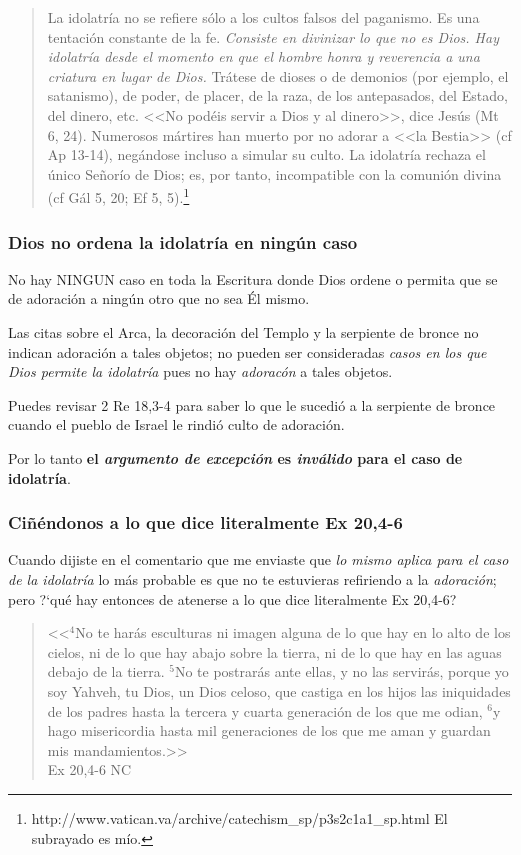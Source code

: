 \documentclass{article}
\begin{document}
\begin{quote}
La idolatría no se refiere sólo a los cultos falsos del paganismo. Es una tentación constante de la fe. \emph{Consiste en divinizar lo que no es Dios. Hay idolatría desde el momento en que el hombre honra y reverencia a una criatura en lugar de Dios.} Trátese de dioses o de demonios (por ejemplo, el satanismo), de poder, de placer, de la raza, de los antepasados, del Estado, del dinero, etc. <<No podéis servir a Dios y al dinero>>, dice Jesús (Mt 6, 24). Numerosos mártires han muerto por no adorar a <<la Bestia>> (cf Ap 13-14), negándose incluso a simular su culto. La idolatría rechaza el único Señorío de Dios; es, por tanto, incompatible con la comunión divina (cf Gál 5, 20; Ef 5, 5).\footnote{http://www.vatican.va/archive/catechism\_sp/p3s2c1a1\_sp.html El subrayado es m\'{i}o.}
\end{quote}

\subsubsection{Dios no ordena la idolatr\'{i}a en ning\'un caso}

No hay NINGUN caso en toda la Escritura donde Dios ordene o permita que se de adoraci\'on a ning\'un otro que no sea \'El mismo.

Las citas sobre el Arca, la decoraci\'on del Templo y la serpiente de bronce no indican adoraci\'on a tales objetos; no pueden ser consideradas \emph{casos en los que Dios permite la idolatr\'{i}a} pues no hay \emph{adorac\'on} a tales objetos.

Puedes revisar 2 Re 18,3-4 para saber lo que le sucedi\'o a la serpiente de bronce cuando el pueblo de Israel le rindi\'o culto de adoraci\'on.

Por lo tanto \textbf{el \emph{argumento de excepci\'on} es \emph{inv\'alido} para el caso de idolatr\'{i}a}.

\subsubsection{Ci\~n\'endonos a lo que dice literalmente Ex 20,4-6}

Cuando dijiste en el comentario que me enviaste que \emph{lo mismo aplica para el caso de la idolatr\'{i}a} lo m\'as probable es que no te estuvieras refiriendo a la \emph{adoraci\'on}; pero ?`qu\'e hay entonces de atenerse a lo que dice literalmente Ex 20,4-6?

\begin{quote}
<<$^4$No te har\'as esculturas ni imagen alguna de lo que hay en lo alto de los cielos, ni de lo que hay abajo sobre la tierra, ni de lo que hay en las aguas debajo de la tierra. $^5$No te postrar\'as ante ellas, y no las servir\'as, porque yo soy Yahveh, tu Dios, un Dios celoso, que castiga en los hijos las iniquidades de los padres hasta la tercera y cuarta generaci\'on de los que me odian, $^6$y hago misericordia hasta mil generaciones de los que me aman y guardan mis mandamientos.>>\\ 
Ex 20,4-6 NC
\end{quote}
\end{document}
